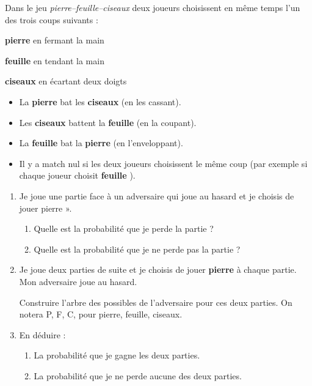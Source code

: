 
\medskip 

Dans le jeu \emph{pierre--feuille--ciseaux} deux joueurs choisissent en même temps l'un des trois \og  coups \fg{} suivants : 

\textbf{pierre} en fermant la main 

\textbf{feuille} en tendant la main 

\textbf{ciseaux} en écartant deux doigts 

\medskip
\begin{itemize}
\item La \textbf{pierre} bat les \textbf{ciseaux} (en les cassant). 
\item Les \textbf{ciseaux} battent la \textbf{feuille} (en la coupant). 
\item La \textbf{feuille} bat la \textbf{pierre} (en l'enveloppant). 
\item Il y a match nul si les deux joueurs choisissent le même coup (par exemple si chaque joueur choisit \og \textbf{feuille} \fg). 
\end{itemize}

\medskip

\begin{enumerate}
\item Je joue une partie face à un adversaire qui joue au hasard et je choisis de jouer \og pierre ». 
	\begin{enumerate}
		\item Quelle est la probabilité que je perde la partie ? 
		\item Quelle est la probabilité que je ne perde pas la partie ? 
	\end{enumerate}
\item  Je joue deux parties de suite et je choisis de jouer \og \textbf{pierre} \fg{} à chaque partie. Mon adversaire joue au hasard. 

Construire l'arbre des possibles de l'adversaire pour ces deux parties. On notera P,\: F,\: C, pour pierre, feuille, ciseaux. 

\item  En déduire : 
	\begin{enumerate}
		\item La probabilité que je gagne les deux parties. 
		\item La probabilité que je ne perde aucune des deux parties. 
	\end{enumerate}
\end{enumerate}

\vspace{0,5cm}

